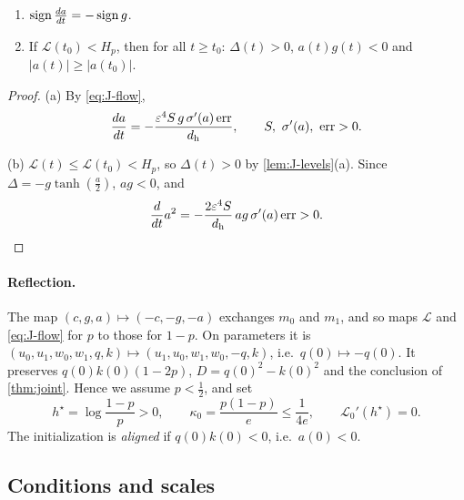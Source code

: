 \begin{lemma}
\label{lem:J-align}
\begin{enumerate}[label=(\alph*),leftmargin=*,itemsep=2pt,topsep=3pt]
\item $\operatorname{sign}\ddt{a}=-\operatorname{sign}g$.
\item If $\mathcal L(t_0)<H_p$, then for all $t\ge t_0$: $\Delta(t)>0$, $a(t)g(t)<0$ and $|a(t)|\ge|a(t_0)|$.
\end{enumerate}
\end{lemma}

\begin{proof}
(a) By \cref{eq:J-flow},
\[
 \ddt{a}=-\frac{\initscale^4S\,g\,\sigma'(a)\,\mathrm{err}}{d_{\mathrm h}},\qquad S,\ \sigma'(a),\ \mathrm{err}>0.
\]

(b) $\mathcal L(t)\le \mathcal L(t_0)<H_p$, so $\Delta(t)>0$ by \cref{lem:J-levels}(a). Since $\Delta=-g\tanh(\frac{a}{2})$, $ag<0$, and
\[
 \frac{d}{dt}a^2=-\frac{2\varepsilon^4S}{d_{\mathrm h}}\,ag\,\sigma'(a)\,\mathrm{err}>0 .
\]
\end{proof}

\paragraph{Reflection.} The map $(c,g,a)\mapsto(-c,-g,-a)$ exchanges $m_0$ and $m_1$, and so maps $\mathcal L$ and \cref{eq:J-flow} for $p$ to those for
$1-p$. On parameters it is $(u_0,u_1,w_0,w_1,q,k)\mapsto(u_1,u_0,w_1,w_0,-q,k)$, i.e.\ $q(0)\mapsto-q(0)$. It preserves $q(0)k(0)(1-2p)$, $D=q(0)^2-k(0)^2$
and the conclusion of \cref{thm:joint}. Hence we assume $p<\frac{1}{2}$, and set
\[
  h^\star=\log\frac{1-p}{p}>0,\qquad \kappa_0=\frac{p(1-p)}{e}\le\frac{1}{4e},\qquad  \mathcal L_0'( h^\star)=0 .
\]
The initialization is \emph{aligned} if $q(0)k(0)<0$, i.e.\ $a(0)<0$.

\subsection{Conditions and scales}
\label{app:J-constants}

